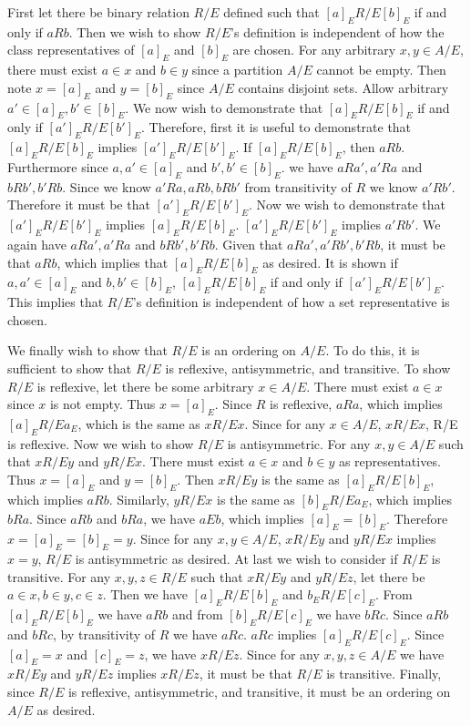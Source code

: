 \documentclass{article}
\begin{document}
\begin{enumerate}
First let there be binary relation $R/E$ defined such that $[a]_{E} R/E [b]_{E}$ if and only if $aRb$. Then we wish to show $R/E$'s definition is independent of how the class representatives of $[a]_{E}$ and $[b]_{E}$ are chosen. For any arbitrary $x,y \in A/E$, there must exist $a \in x$ and $b \in y$ since a partition $A/E$ cannot be empty. Then note $x = [a]_{E}$ and $y = [b]_{E}$ since $A/E$ contains disjoint sets. Allow arbitrary $a' \in [a]_{E}, b' \in [b]_{E}$. We now wish to demonstrate that $[a]_{E} R/E [b]_{E}$ if and only if $[a']_{E} R/E [b']_{E}$. Therefore, first it is useful to demonstrate that $[a]_{E} R/E [b]_{E}$ implies $[a']_{E} R/E [b']_{E}$. If $[a]_{E} R/E [b]_{E}$, then $aRb$. Furthermore since $a,a' \in [a]_{E}$ and $b',b' \in [b]_{E}$. we have $aRa', a'Ra$ and $bRb', b'Rb$. Since we know $a'Ra, aRb, bRb'$ from transitivity of $R$ we know $a'Rb'$. Therefore it must be that $[a']_{E} R/E [b']_{E}$. Now we wish to demonstrate that $[a']_{E} R/E [b']_{E}$ implies $[a]_{E} R/E [b]_{E}$. $[a']_{E} R/E [b']_{E}$ implies $a'Rb'$. We again have $aRa', a'Ra$ and $bRb', b'Rb$. Given that $aRa', a'Rb', b'Rb$, it must be that $aRb$, which implies that $[a]_{E} R/E [b]_{E}$ as desired. It is shown if $a,a' \in [a]_{E}$ and $b,b' \in [b]_{E}$, $[a]_{E} R/E [b]_{E}$ if and only if $[a']_{E} R/E [b']_{E}$. This implies that $R/E$'s definition is independent of how a set representative is chosen.

\medskip

We finally wish to show that $R/E$ is an ordering on $A/E$. To do this, it is sufficient to show that $R/E$ is reflexive, antisymmetric, and transitive. To show $R/E$ is reflexive, let there be some arbitrary $x \in A/E$. There must exist $a \in x$ since $x$ is not empty. Thus $x = [a]_{E}$. Since $R$ is reflexive, $aRa$, which implies $[a]_{E} R/E a_{E}$, which is the same as $x R/E x$. Since for any $x \in A/E$, $x R/E x$, R/E is reflexive. Now we wish to show $R/E$ is antisymmetric. For any $x,y \in A/E$ such that $x R/E y$ and $y R/E x$. There must exist $a \in x$ and $b \in y$ as representatives. Thus $x = [a]_{E}$ and $y = [b]_{E}$. Then $x R/E y$ is the same as $[a]_{E} R/E [b]_{E}$, which implies $aRb$. Similarly, $y R/E x$ is the same as $[b]_{E} R/E a_{E}$, which implies $bRa$. Since $aRb$ and $bRa$, we have $aEb$, which implies $[a]_{E} = [b]_{E}$. Therefore $x = [a]_{E} = [b]_{E} = y$. Since for any $x,y \in A/E$, $x R/E y$ and $y R/E x$ implies $x = y$, $R/E$ is antisymmetric as desired. At last we wish to consider if $R/E$ is transitive. For any $x,y,z \in R/E$ such that $x R/E y$ and $y R/E z$, let there be $a \in x, b \in y, c \in z$. Then we have $[a]_{E} R/E [b]_{E}$ and $b_{E} R/E [c]_{E}$. From $[a]_{E} R/E [b]_{E}$ we have $aRb$ and from $[b]_{E} R/E [c]_{E}$ we have $bRc$. Since $aRb$ and $bRc$, by transitivity of $R$ we have $aRc$. $aRc$ implies $[a]_{E} R/E [c]_{E}$. Since $[a]_{E} = x$ and $[c]_{E} = z$, we have $x R/E z$. Since for any $x,y,z \in A/E$ we have $x R/E y$ and $y R/E z$ implies $x R/E z$, it must be that $R/E$ is transitive. Finally, since $R/E$ is reflexive, antisymmetric, and transitive, it must be an ordering on $A/E$ as desired. 


\end{enumerate}
\end{document}
